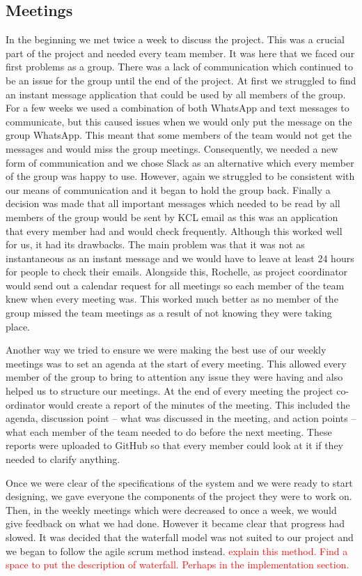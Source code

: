 \documentclass{article}
\begin{document}
\subsection{Meetings}
 In the beginning we met twice a week to discuss the project. 
 This was a crucial part of the project and needed every team member. 
 It was here that we faced our first problems as a group. 
 There was a lack of communication which continued to be an issue for the group until the end of the project. 
 At first we struggled to find an instant message application that could be used by all members of the group. 
 For a few weeks we used a combination of both WhatsApp and text messages to communicate, but this caused issues when we would only put the message on the group WhatsApp. 
 This meant that some members of the team would not get the messages and would miss the group meetings. 
 Consequently, we needed a new form of communication and we chose Slack as an alternative which every member of the group was happy to use. 
 However, again we struggled to be consistent with our means of communication and it began to hold the group back. 
 Finally a decision was made that all important messages which needed to be read by all members of the group would be sent by KCL email as this was an application that every member had and would check frequently. 
 Although this worked well for us, it had its drawbacks. 
 The main problem was that it was not as instantaneous as an instant message and we would have to leave at least 24 hours for people to check their emails. 
 Alongside this, Rochelle, as project coordinator would send out a calendar request for all meetings so each member of the team knew when every meeting was. 
 This worked much better as no member of the group missed the team meetings as a result of not knowing they were taking place. 
 
 Another way we tried to ensure we were making the best use of our weekly meetings was to set an agenda at the start of every meeting. 
 This allowed every member of the group to bring to attention any issue they were having and also helped us to structure our meetings. 
 At the end of every meeting the project co-ordinator would create a report of the minutes of the meeting. This included the agenda, discussion point -- what was discussed in the meeting, and action points -- what each member of the team needed to do before the next meeting. 
 These reports were uploaded to GitHub so that every member could look at it if they needed to clarify anything.
 
 Once we were clear of the specifications of the system and we were ready to start designing, we gave everyone the components of the project they were to work on. Then, in the weekly meetings which were decreased to once a week, we would give feedback on what we had done. However it became clear that progress had slowed. It was decided that the waterfall model was not suited to our project and we began to follow the agile scrum method instead. \textcolor{red}{explain this method. Find a space to put the description of waterfall. Perhaps in the implementation section.}
 
\end{document}
